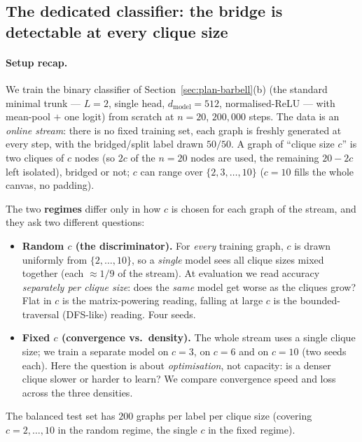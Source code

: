 \documentclass[11pt,a4paper]{article}
\begin{document}
\subsection{The dedicated classifier: the bridge is detectable at every clique size}
\label{sec:res-clf}

\paragraph{Setup recap.} We train the binary classifier of Section~\ref{sec:plan-barbell}(b)
(the standard minimal trunk --- $L=2$, single head, $d_{\mathrm{model}}=512$, normalised-ReLU ---
with mean-pool $+$ one logit) from scratch at $n=20$, $200{,}000$ steps. The data is an
\emph{online stream}: there is no fixed training set, each graph is freshly generated at every
step, with the bridged/split label drawn $50/50$. A graph of ``clique size $c$'' is two cliques of
$c$ nodes (so $2c$ of the $n=20$ nodes are used, the remaining $20-2c$ left isolated), bridged or
not; $c$ can range over $\{2,3,\dots,10\}$ ($c=10$ fills the whole canvas, no padding).

The two \textbf{regimes} differ only in how $c$ is chosen for each graph of the stream, and they
ask two different questions:
\begin{itemize}\setlength\itemsep{0.1em}
  \item \textbf{Random $c$ (the discriminator).} For \emph{every} training graph, $c$ is drawn
        uniformly from $\{2,\dots,10\}$, so a \emph{single} model sees all clique sizes mixed
        together (each $\approx 1/9$ of the stream). At evaluation we read accuracy \emph{separately
        per clique size}: does the \emph{same} model get worse as the cliques grow? Flat in $c$ is
        the matrix-powering reading, falling at large $c$ is the bounded-traversal (DFS-like)
        reading. Four seeds.
  \item \textbf{Fixed $c$ (convergence vs.\ density).} The whole stream uses a single clique size;
        we train a separate model on $c=3$, on $c=6$ and on $c=10$ (two seeds each). Here the
        question is about \emph{optimisation}, not capacity: is a denser clique slower or harder to
        learn? We compare convergence speed and loss across the three densities.
\end{itemize}
The balanced test set has $200$ graphs per label per clique size (covering $c=2,\dots,10$ in the
random regime, the single $c$ in the fixed regime).
\end{document}
